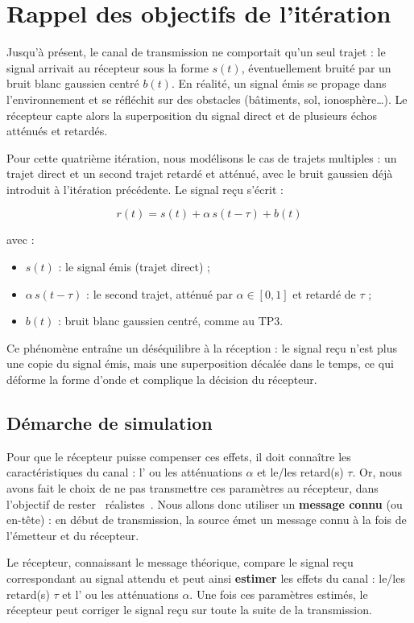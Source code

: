 \documentclass[a4paper,12pt]{report}
\begin{document}
\section{Rappel des objectifs de l'itération}


Jusqu'à présent, le canal de transmission ne comportait qu'un seul
trajet : le signal arrivait au récepteur sous la forme $s(t)$,
éventuellement bruité par un bruit blanc gaussien centré $b(t)$. En réalité,
un signal émis se propage dans l'environnement et se réfléchit sur
des obstacles (bâtiments, sol, ionosphère\dots). Le récepteur capte
alors la superposition du signal direct et de plusieurs échos
atténués et retardés.

Pour cette quatrième itération, nous modélisons le cas de trajets multiples : un trajet direct et un second trajet retardé et atténué, avec le bruit gaussien déjà introduit à l'itération précédente. Le signal reçu s'écrit :

$$r(t) = s(t) + \alpha\, s(t - \tau) + b(t)$$

avec :
\begin{itemize}
    \item $s(t)$ : le signal émis (trajet direct) ;
    \item $\alpha\, s(t-\tau)$ : le second trajet, atténué par
          $\alpha \in [0,1]$ et retardé de $\tau$ ;
    \item $b(t)$ : bruit blanc gaussien centré, comme au TP3.
\end{itemize}

Ce phénomène entraîne un déséquilibre à la réception : le signal reçu
n'est plus une copie du signal émis, mais une superposition
décalée dans le temps, ce qui déforme la forme d'onde et complique
la décision du récepteur.

\subsection{Démarche de simulation}

Pour que le récepteur puisse compenser ces effets, il doit connaître
les caractéristiques du canal : l' ou les atténuations $\alpha$ et le/les retard(s)
$\tau$. Or, nous avons fait le choix de ne pas transmettre ces paramètres au récepteur, dans l'objectif de rester \og{}~réalistes~\fg{}. Nous allons
donc utiliser un \textbf{message connu} (ou en-tête) : en début de transmission, la source émet un
message connu à la fois de l'émetteur et du récepteur.

Le récepteur, connaissant le message théorique, compare le signal
reçu correspondant au signal attendu et peut ainsi \textbf{estimer}
les effets du canal : le/les retard(s) $\tau$ et l' ou les atténuations $\alpha$. Une fois ces paramètres estimés, le récepteur peut corriger le signal reçu sur toute la suite de la transmission.
\end{document}
